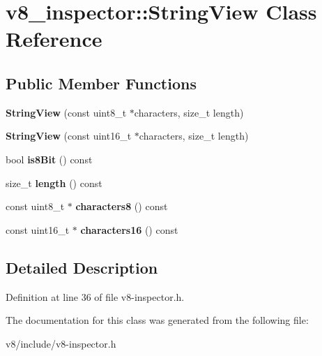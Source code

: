 \hypertarget{classv8__inspector_1_1StringView}{}\section{v8\+\_\+inspector\+:\+:String\+View Class Reference}
\label{classv8__inspector_1_1StringView}
\subsection*{Public Member Functions}
\begin{DoxyCompactItemize}
\item 
\mbox{\label{classv8__inspector_1_1StringView_aafc4d42555f35f95d6c2264432b89995}} 
{\bfseries String\+View} (const uint8\+\_\+t $\ast$characters, size\+\_\+t length)
\item 
\mbox{\label{classv8__inspector_1_1StringView_acb0f9ca01c2e1d55e7f94e6b1421d76e}} 
{\bfseries String\+View} (const uint16\+\_\+t $\ast$characters, size\+\_\+t length)
\item 
\mbox{\label{classv8__inspector_1_1StringView_ab2c2899bfa07d0bc745b8a01592a761a}} 
bool {\bfseries is8\+Bit} () const
\item 
\mbox{\label{classv8__inspector_1_1StringView_a2e851af43b41d8af7978c8b2480cbb34}} 
size\+\_\+t {\bfseries length} () const
\item 
\mbox{\label{classv8__inspector_1_1StringView_a5e5f5f3ec476455ebdf526cb26a468f7}} 
const uint8\+\_\+t $\ast$ {\bfseries characters8} () const
\item 
\mbox{\label{classv8__inspector_1_1StringView_abf54908b25a843c15f482328f5b1206f}} 
const uint16\+\_\+t $\ast$ {\bfseries characters16} () const
\end{DoxyCompactItemize}


\subsection{Detailed Description}


Definition at line 36 of file v8-\/inspector.\+h.



The documentation for this class was generated from the following file\+:\begin{DoxyCompactItemize}
\item 
v8/include/v8-\/inspector.\+h\end{DoxyCompactItemize}
